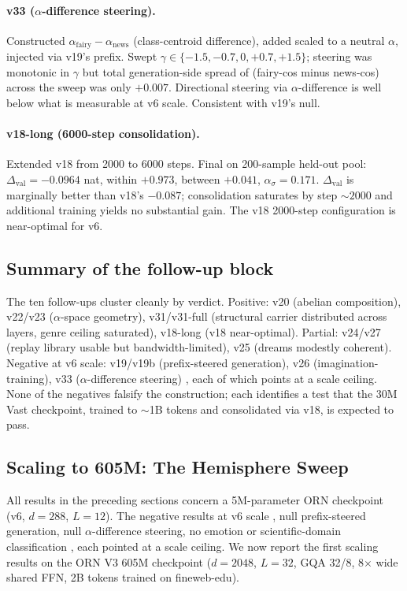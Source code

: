 \documentclass[11pt, a4paper]{article}
\theoremstyle{plain}
\theoremstyle{definition}
\theoremstyle{remark}
\begin{document}
\paragraph{v33 ($\alpha$-difference steering).}
Constructed $\alpha_{\mathrm{fairy}} - \alpha_{\mathrm{news}}$ (class-centroid difference), added scaled to a neutral $\alpha$, injected via v19's prefix.
Swept $\gamma \in \{-1.5, -0.7, 0, +0.7, +1.5\}$; steering was monotonic in $\gamma$ but total generation-side spread of (fairy-cos minus news-cos) across the sweep was only $+0.007$.
Directional steering via $\alpha$-difference is well below what is measurable at v6 scale. Consistent with v19's null.

\paragraph{v18-long (6000-step consolidation).}
Extended v18 from 2000 to 6000 steps. Final on 200-sample held-out pool: $\Delta_{\mathrm{val}} = -0.0964$ nat, within $+0.973$, between $+0.041$, $\alpha_\sigma = 0.171$.
$\Delta_{\mathrm{val}}$ is marginally better than v18's $-0.087$; consolidation saturates by step $\sim 2000$ and additional training yields no substantial gain. The v18 2000-step configuration is near-optimal for v6.

\subsection{Summary of the follow-up block}

The ten follow-ups cluster cleanly by verdict. Positive: v20 (abelian composition), v22/v23 ($\alpha$-space geometry), v31/v31-full (structural carrier distributed across layers, genre ceiling saturated), v18-long (v18 near-optimal). Partial: v24/v27 (replay library usable but bandwidth-limited), v25 (dreams modestly coherent). Negative at v6 scale: v19/v19b (prefix-steered generation), v26 (imagination-training), v33 ($\alpha$-difference steering) ,  each of which points at a scale ceiling. None of the negatives falsify the construction; each identifies a test that the 30M Vast checkpoint, trained to $\sim$1B tokens and consolidated via v18, is expected to pass.


\subsection{Scaling to 605M: The Hemisphere Sweep}
\label{sec:605m}

All results in the preceding sections concern a 5M-parameter ORN checkpoint (v6, $d{=}288$, $L{=}12$). The negative results at v6 scale ,  null prefix-steered generation, null $\alpha$-difference steering, no emotion or scientific-domain classification ,  each pointed at a scale ceiling. We now report the first scaling results on the ORN V3 605M checkpoint ($d{=}2048$, $L{=}32$, GQA 32/8, 8$\times$ wide shared FFN, 2B tokens trained on fineweb-edu).
\end{document}
